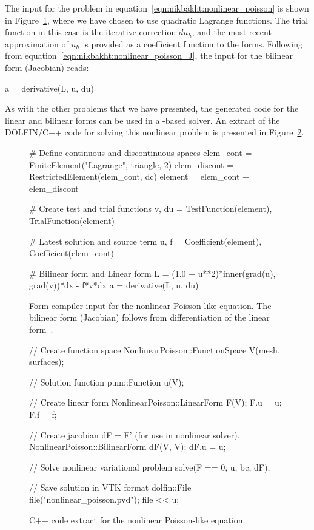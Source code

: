 The \ufl{} input for the problem in
equation~\eqref{eqn:nikbakht:nonlinear_poisson} is shown in
Figure~\ref{fig:nikbakht:ufl_nonlinear_poisson}, where we have chosen
to use quadratic Lagrange functions.  The trial function in this case is
the iterative correction $du_{h}$, and the most recent approximation of
$u_{h}$ is provided as a coefficient function to the forms.  Following
from equation~\eqref{eqn:nikbakht:nonlinear_poisson_J}, the \ufl{}
input for the bilinear form (Jacobian) reads:
%
\begin{python}
a = derivative(L, u, du)
\end{python}
%
As with the other problems that we have presented, the generated code for
the linear and bilinear forms can be used in a \dolfin{}-based solver.
An extract of the DOLFIN/C++ code for solving this nonlinear problem is
presented in Figure~\ref{fig:nikbakht:c++_nonlinear_poisson}.

\begin{figure}
\bwfig
\begin{python}
# Define continuous and discontinuous spaces
elem_cont    = FiniteElement("Lagrange", triangle, 2)
elem_discont = RestrictedElement(elem_cont, dc)
element      = elem_cont + elem_discont

# Create test and trial functions
v, du = TestFunction(element), TrialFunction(element)

# Latest solution and source term
u, f = Coefficient(element), Coefficient(elem_cont)

# Bilinear form and Linear form
L = (1.0 + u**2)*inner(grad(u), grad(v))*dx - f*v*dx
a = derivative(L, u, du)
\end{python}
\caption{Form compiler input for the nonlinear Poisson-like equation. The bilinear
form (Jacobian) follows from differentiation of the linear form~.}
\label{fig:nikbakht:ufl_nonlinear_poisson}
\end{figure}

\begin{figure}
\bwfig
\begin{c++}
// Create function space
NonlinearPoisson::FunctionSpace V(mesh, surfaces);

// Solution function
pum::Function u(V);

// Create linear form
NonlinearPoisson::LinearForm F(V);
F.u = u; F.f = f;

// Create jacobian dF = F' (for use in nonlinear solver).
NonlinearPoisson::BilinearForm dF(V, V);
dF.u = u;

// Solve nonlinear variational problem
solve(F == 0, u, bc, dF);

// Save solution in VTK format
dolfin::File file("nonlinear_poisson.pvd");
file << u;
\end{c++}
\caption{C++ code extract for the nonlinear Poisson-like equation.}
\label{fig:nikbakht:c++_nonlinear_poisson}
\end{figure}

